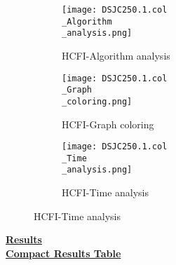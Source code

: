 \documentclass[10pt]{article}
\begin{document}
\graphicspath{{./Core1/Solutions/HCFI/DSJC250.1.col}}
\begin{figure}[H]
\begin{subfigure}{.33\textwidth}
  \centering
  \texttt{[image: DSJC250.1.col\\\_Algorithm\\\_analysis.png]}
  \caption{HCFI-Algorithm analysis}
   \label{fig:subfig1}
\end{subfigure}%
\begin{subfigure}{.33\textwidth}
  \centering
  \texttt{[image: DSJC250.1.col\\\_Graph\\\_coloring.png]}
  \caption{HCFI-Graph coloring}
  \label{fig:subfig2}
\end{subfigure}
\begin{subfigure}{.33\textwidth}
  \centering
  \texttt{[image: DSJC250.1.col\\\_Time\\\_analysis.png]}
  \caption{HCFI-Time analysis}
  \end{subfigure}
\end{figure}
\vspace{2cm}
\begin{center}
\hyperlink{page.8}{\textbf{Results}}\\
\vspace{0.5cm}
\hyperlink{page.71}{\textbf{Compact Results Table}}
\end{center}
\pagebreak
\end{document}
